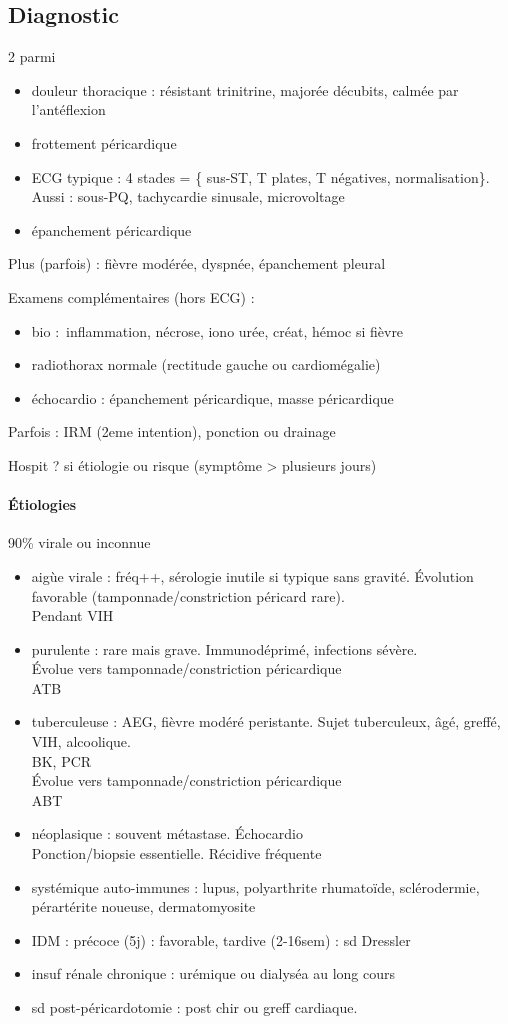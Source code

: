 \documentclass{article}
\begin{document}
\subsection{Diagnostic}
2 parmi
\begin{itemize}
  \item douleur thoracique : résistant trinitrine, majorée décubits, calmée par
    l'antéflexion
  \item frottement péricardique
  \item ECG typique : 4 stades = \{ sus-ST, T plates, T négatives,
    normalisation\}. Aussi : sous-PQ, tachycardie sinusale, microvoltage
  \item épanchement péricardique
\end{itemize}
Plus (parfois) : fièvre modérée, dyspnée, épanchement pleural

Examens complémentaires (hors ECG) :
\begin{itemize}
  \item bio : inflammation, nécrose, iono urée, créat, hémoc si fièvre
  \item radiothorax normale (rectitude gauche ou cardiomégalie)
  \item échocardio : épanchement péricardique, masse péricardique
\end{itemize}
Parfois : IRM (2eme intention), ponction ou drainage

Hospit ? si étiologie ou risque (symptôme > plusieurs jours)

\paragraph{Étiologies} 90\% virale ou inconnue
\begin{itemize}
  \item aigùe virale : fréq++, sérologie inutile si typique sans gravité.
    Évolution favorable (tamponnade/constriction péricard rare).\\
    Pendant VIH
  \item purulente : rare mais grave. Immunodéprimé, infections sévère.\\
    Évolue vers tamponnade/constriction péricardique\\
    ATB
  \item tuberculeuse : AEG, fièvre modéré peristante. Sujet tuberculeux, âgé,
    greffé, VIH, alcoolique.\\
    BK, PCR\\
    Évolue vers tamponnade/constriction péricardique\\
    ABT
  \item néoplasique : souvent métastase. Échocardio\\
    Ponction/biopsie essentielle. Récidive fréquente
  \item systémique auto-immunes : lupus, polyarthrite rhumatoïde, sclérodermie,
    pérartérite noueuse, dermatomyosite
  \item IDM : précoce (5j) : favorable, tardive (2-16sem) : sd Dressler
  \item insuf rénale chronique : urémique ou dialyséa au long cours
  \item sd post-péricardotomie : post chir ou greff cardiaque.
\end{itemize}
\end{document}
